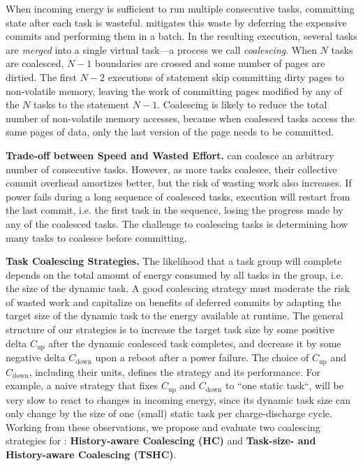 When incoming energy is sufficient to run multiple consecutive tasks,
committing state after each task is wasteful. \sys mitigates this
waste by deferring the expensive commits and performing them in a
batch. In the resulting execution, several tasks are \emph{merged} into a
single virtual task---a process we call \emph{coalescing}. 
%
When $N$ tasks are coalesced, $N-1$ boundaries are crossed and some number of
pages are dirtied. The first $N-2$ executions of \transition statement skip
committing dirty pages to non-volatile memory, leaving the work of committing
pages modified by any of the $N$ tasks to the statement $N-1$.
Coalescing is likely to reduce the total number of non-volatile memory
accesses, because when coalesced tasks access the same pages of data, only the
last version of the page needs to be committed.

\textbf{Trade-off between Speed and Wasted Effort.} \sys can coalesce an
arbitrary number of consecutive tasks. However, as more tasks coalesce, their
collective commit overhead amortizes better, but the risk of wasting work also
increases. If power fails during a long sequence of coalesced tasks, execution
will restart from the last commit, i.e. the first task in the sequence, losing
the progress made by any of the coalesced tasks.  The challenge to coalescing
tasks is determining how many tasks to coalesce before committing.
%

\textbf{Task Coalescing Strategies.} 
%
The likelihood that a task group will complete depends on the total amount of
energy consumed by all tasks in the group, i.e. the size of the dynamic task.
%
A good coalescing strategy must moderate the risk of wasted work and capitalize
on benefits of deferred commits by adapting the target size of the dynamic task
to the energy available at runtime.
%
The general structure of our strategies is to increase the target task size by
some positive delta $C_\text{up}$ after the dynamic coalesced task completes,
and decrease it by some negative delta $C_\text{down}$ upon a reboot after a
power failure.
%
The choice of $C_\text{up}$ and $C_\text{down}$, including their units, defines
the strategy and its performance.
%
For example, a naive strategy that fixes $C_\text{up}$ and $C_\text{down}$ to
``one static task``, will be very slow to react to changes in incoming energy,
since its dynamic task size can only change by the size of one (small) static
task per charge-discharge cycle.
%
Working from these observations, we propose and evaluate two coalescing
strategies for \sys: \textbf{History-aware Coalescing (HC)} and
\textbf{Task-size- and History-aware Coalescing (TSHC)}.

